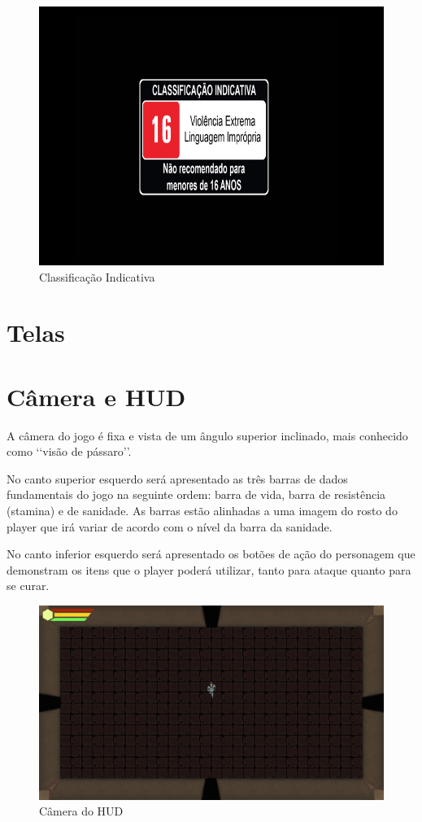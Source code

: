 \documentclass[12pt]{article}
\begin{document}
\begin{figure}[!h]
    \centering
    \caption{Classificação Indicativa}
    \includegraphics[keepaspectratio=true,scale=0.30]{images/classificacao_indicativa.png}
\end{figure}

\section{Telas}

\section{Câmera e HUD}
A câmera do jogo é fixa e vista de um ângulo superior inclinado, mais conhecido como \lq\lq visão de pássaro\rq\rq. 

No canto superior esquerdo será apresentado as três barras de dados fundamentais do jogo na seguinte ordem: barra de vida, barra de resistência (stamina) e de sanidade. As barras estão alinhadas a uma imagem do rosto do player que irá variar de acordo com o nível da barra da sanidade.

No canto inferior esquerdo será apresentado os botões de ação do personagem que demonstram os itens que o player poderá utilizar, tanto para ataque quanto para se curar.

\begin{figure}[!h]
    \centering
    \caption{Câmera do HUD}
    \includegraphics[keepaspectratio=true,scale=0.35]{images/HUD.jpg}
\end{figure}
\end{document}
